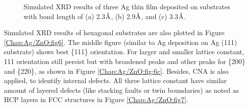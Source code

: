 \begingroup
\begin{figure}[!ht]
  \centering
  \label{Chap:Ag/ZnO:fig:8d}
  \label{Chap:Ag/ZnO:fig:8e}
  \label{Chap:Ag/ZnO:fig:8f}
\caption[Simulated XRD results of Ag thin film morphology on rectangular substrates.]{Simulated \ac{XRD} results of three Ag thin film  deposited on substrates with bond length of (a) 2.3$\mbox{\normalfont\AA}$, (b) 2.9$\mbox{\normalfont\AA}$, and (c) 3.3$\mbox{\normalfont\AA}$.}
  \label{Chap:Ag/ZnO:fig8-2}
\end{figure}
\endgroup


Simulated \ac{XRD} results of hexagonal substrates are also plotted in Figure \ref{Chap:Ag/ZnO:fig6}. The middle figure (similar to Ag deposition on Ag (111) substrate) shows best \{111\} orientation. For larger and smaller lattice constant, {111} orientation still persist but with broadened peaks and other peaks for \{200\} and \{220\}, as shown in Figure \ref{Chap:Ag/ZnO:fig:6c}. Besides, \acf{CNA} \cite{kelton1991crystal} is also applied, to identify internal defects. All three lattice constant have similar amount of layered defects (like stacking faults or twin boundaries) as noted as \ac{HCP} layers in \ac{FCC} structures in Figure \ref{Chap:Ag/ZnO:fig7}.

